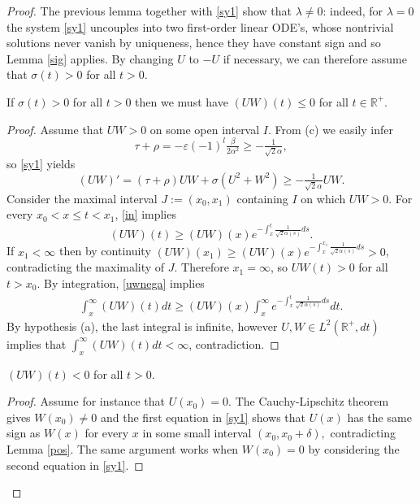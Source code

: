 \documentclass[12pt]{amsart}
\begin{document}
\begin{proof}
The previous lemma 
together with \eqref{sy1} show that $\lambda\ne0$: indeed, for $\lambda=0$ 
the system \eqref{sy1} uncouples into two first-order linear ODE's, 
whose nontrivial solutions never vanish by uniqueness, hence 
they have constant sign and so Lemma \ref{sig} applies. 
By changing $U$ to $-U$ if necessary, we can therefore assume that 
$\sigma(t)> 0$ for all $t>0$. 
\begin{lemma}\label{pos} 
If $\sigma(t)>0$ for all $t>0$ then we must have
$(UW)(t)\le 0$ for all $t\in{{\mathbb R}}^+$.
\end{lemma} 
\begin{proof}
Assume that $UW>0$ on some open interval $I$. From (c) we easily infer 
\begin{equation}\label{ine}
\tau+\rho = -\varepsilon (-1)^l\tfrac{\beta}{2\alpha^2}\ge
-\tfrac{1}{\sqrt{2}{\alpha}}, \end{equation} 
so \eqref{sy1} yields 
\begin{equation}\label{in}(UW)'=(\tau+\rho)UW+\sigma(U^2+W^2)\ge -\tfrac{1}{\sqrt 2{\alpha}}UW.\end{equation}
Consider the maximal interval $J:=(x_0,x_1)$ containing $I$ on which
$UW>0$. For every $x_0<x\leq t<x_1$, \eqref{in} implies
\begin{equation}\label{uwnega}
(UW)(t)\ge (UW)(x)e^{-\int_x^{t}\frac{1}{\sqrt 2{\alpha}(s)}ds}.
\end{equation}
If $x_1<\infty$ then by continuity 
$(UW)(x_1)\ge(UW)(x)e^{-\int_x^{x_1} \frac{1}{\sqrt 2{\alpha}(s)}ds}>0$,
contradicting the maximality of $J$. Therefore $x_1=\infty$, so $UW(t)>0$
for all $t>x_0$. By integration, \eqref{uwnega} implies
\begin{align*}
\int_x^\infty (UW)(t)dt\geq (UW)(x)\int_x^\infty
e^{-\int_x^t\frac{1}{\sqrt 2{\alpha}(s)}ds}dt. 
\end{align*}
By hypothesis (a), the last integral is infinite, however 
$U,W\in L^2({{\mathbb R}}^+,dt)$ implies that 
$\int_x^\infty (UW)(t)dt<\infty$, contradiction.
\end{proof}

\begin{lemma}\label{pos1} 
$(UW)(t)<0$ for all $t>0$.
\end{lemma} 
\begin{proof} Assume for instance that $U(x_0)=0$. The Cauchy-Lipschitz 
theorem gives $W(x_0)\ne 0$ and the first equation in \eqref{sy1} shows 
that $U(x)$ has the same sign as $W(x)$ for every $x$ in some small interval
$(x_0,x_0+\delta),$ contradicting Lemma \ref{pos}. The same argument works when
$W(x_0)=0$ by considering the second equation in \eqref{sy1}.
\end{proof}


\end{proof}
\end{document}
